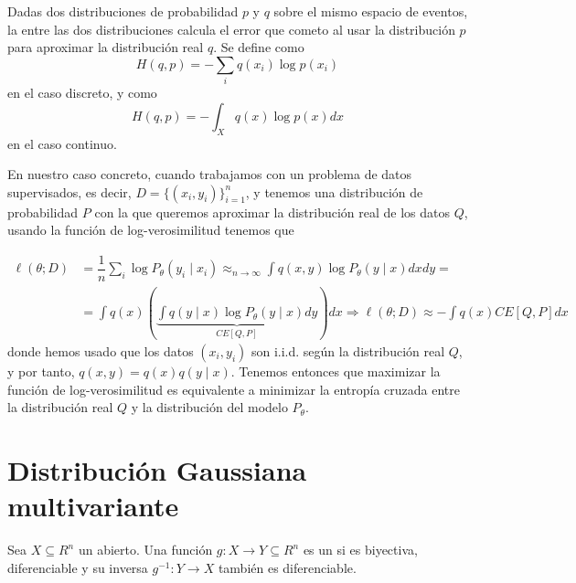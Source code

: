 \begin{definicion}
    Dadas dos distribuciones de probabilidad $p$ y $q$ sobre el mismo espacio de eventos, la  entre las dos distribuciones calcula el error que cometo al usar la distribución $p$ para aproximar la distribución real $q$. Se define como
    \begin{equation*}
        H(q, p) = - \sum\limits_{i} q(x_i) \log p(x_i)
    \end{equation*}
    en el caso discreto, y como
    \begin{equation*}
        H(q, p) = - \int_{X} q(x) \log p(x) dx
    \end{equation*}
    en el caso continuo.
\end{definicion}
\noindent
En nuestro caso concreto, cuando trabajamos con un problema de datos supervisados, es decir, $D=\{(x_i,y_i)\}_{i=1}^{n}$, y tenemos una distribución de probabilidad $P$ con la que queremos aproximar la distribución real de los datos $Q$, usando la función de log-verosimilitud tenemos que 

\begin{align*}
    \ell(\theta; D) &= \dfrac{1}{n} \sum_{i} \log P_{\theta}(y_i \mid x_i) \approx_{n\to \infty} \int q(x,y) \log P_{\theta}(y \mid x) dx dy = \\
    &= \int q(x) \left( \underbrace{\int q(y\mid x) \log P_{\theta}(y \mid x) dy}_{CE[Q,P]} \right) dx \Longrightarrow \ell(\theta; D) \approx - \int q(x) CE[Q,P] dx
\end{align*}
donde hemos usado que los datos $(x_i,y_i)$ son i.i.d. según la distribución real $Q$, y por tanto, $q(x,y) = q(x) q(y\mid x)$. Tenemos entonces que maximizar la función de log-verosimilitud es equivalente a minimizar la entropía cruzada entre la distribución real $Q$ y la distribución del modelo $P_{\theta}$. \\


\section{Distribución Gaussiana multivariante}
\begin{definicion}[Difeomorfismo]
    Sea $X\subseteq R^n$ un abierto. Una función $g: X \to Y \subseteq R^n$ es un  si es biyectiva, diferenciable y su inversa $g^{-1}: Y \to X$ también es diferenciable.
\end{definicion}

